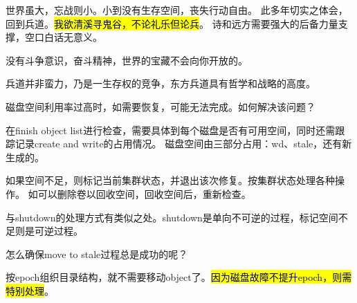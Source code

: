 世界虽大，忘战则小。小到没有生存空间，丧失行动自由。
此多年切实之体会，回到兵道。\hl{我欲清溪寻鬼谷，不论礼乐但论兵}。
诗和远方需要强大的后备力量支撑，空口白话无意义。

没有斗争意识，奋斗精神，世界的宝藏不会向你开放的。

兵道并非蛮力，乃是一生存权的竞争，东方兵道具有哲学和战略的高度。

\hrulefill

磁盘空间利用率过高时，如需要恢复，可能无法完成。如何解决该问题？

在finish object list进行检查，需要具体到每个磁盘是否有可用空间，同时还需跟踪记录create and write的占用情况。
磁盘空间由三部分占用：wd、stale，还有新生成的。

如果空间不足，则标记当前集群状态，并退出该次修复。按集群状态处理各种操作。
如可以删除卷以回收空间，回收空间后，重新检查。

与shutdown的处理方式有类似之处。shutdown是单向不可逆的过程，标记空间不足则是可逆过程。

\hrulefill

怎么确保move to stale过程总是成功的呢？

按epoch组织目录结构，就不需要移动object了。\hl{因为磁盘故障不提升epoch，则需特别处理}。

